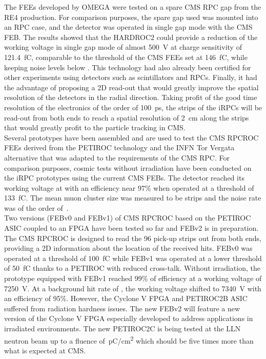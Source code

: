 	The FEEs developed by OMEGA were tested on a spare CMS RPC gap from the RE4 production. For comparison purposes, the spare gap used was mounted into an RPC case, and the detector was operated in single gap mode with the CMS FEB. The results showed that the HARDROC2 could provide a reduction of the working voltage in single gap mode of almost \SI{500}{V} at charge sensitivity of \SI{121.4}{fC}, comparable to the threshold of the CMS FEEs set at \SI{146}{fC}, while keeping noise levels below . This technology had also already been certified for other experiments using detectors such as scintillators and RPCs. Finally, it had the advantage of proposing a 2D read-out that would greatly improve the spatial resolution of the detectors in the radial direction. Taking profit of the good time resolution of the electronics of the order of \SI{100}{ps}, the strips of the iRPCs will be read-out from both ends to reach a spatial resolution of \SI{2}{cm} along the strips that would greatly profit to the particle tracking in CMS.\\
	Several prototypes have been assembled and are used to test the CMS RPCROC FEEs derived from the PETIROC technology and the INFN Tor Vergata alternative that was adapted to the requirements of the CMS RPC. For comparison purposes, cosmic tests without irradiation have been conducted on the iRPC prototypes using the current CMS FEBs. The detector reached its working voltage at  with an efficiency near 97\% when operated at a threshold of \SI{133}{fC}. The mean muon cluster size was measured to be  strips and the noise rate was of the order of \,\sirate.\\
	Two versions (FEBv0 and FEBv1) of CMS RPCROC based on the PETIROC ASIC coupled to an FPGA have been tested so far and FEBv2 is in preparation. The CMS RPCROC is designed to read the 96 pick-up strips out from both ends, providing a 2D information about the location of the received hits. FEBv0 was operated at a threshold of \SI{100}{fC} while FEBv1 was operated at a lower threshold of \SI{50}{fC} thanks to a PETIROC with reduced cross-talk. Without irradiation, the prototype equipped with FEBv1 reached 99\% of efficiency at a working voltage of \SI{7250}{V}. At a background hit rate of , the working voltage shifted to \SI{7340}{V} with an efficiency of 95\%. However, the Cyclone V FPGA and PETIROC2B ASIC suffered from radiation hardness issues. The new FEBv2 will feature a new version of the Cyclone V FPGA especially developed to address applications in irradiated environments. The new PETIROC2C is being tested at the \acf{LLN} neutron beam up to a fluence of \,\si{pC/cm^2} which should be five times more than what is expected at CMS.\\
